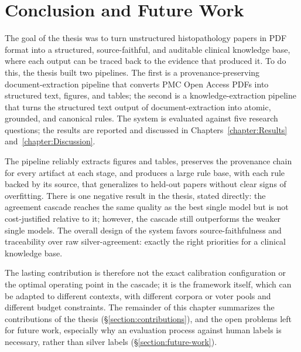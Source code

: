
\chapter{Conclusion and Future Work}\label{chapter:Conclusion_and_Future_Work}

The goal of the thesis was to turn unstructured histopathology papers in PDF format into a structured, source-faithful, and auditable clinical knowledge base, where each output can be traced back to the evidence that produced it. To do this, the thesis built two pipelines. The first is a provenance-preserving document-extraction pipeline that converts PMC Open Access PDFs into structured text, figures, and tables; the second is a knowledge-extraction pipeline that turns the structured text output of document-extraction into atomic, grounded, and canonical rules. The system is evaluated against five research questions; the results are reported and discussed in Chapters~\ref{chapter:Results} and~\ref{chapter:Discussion}.

The pipeline reliably extracts figures and tables, preserves the provenance chain for every artifact at each stage, and produces a large rule base, with each rule backed by its source, that generalizes to held-out papers without clear signs of overfitting. There is one negative result in the thesis, stated directly: the agreement cascade reaches the same quality as the best single model but is not cost-justified relative to it; however, the cascade still outperforms the weaker single models. The overall design of the system favors source-faithfulness and traceability over raw silver-agreement: exactly the right priorities for a clinical knowledge base.

The lasting contribution is therefore not the exact calibration configuration or the optimal operating point in the cascade; it is the framework itself, which can be adapted to different contexts, with different corpora or voter pools and different budget constraints. The remainder of this chapter summarizes the contributions of the thesis (§\ref{section:contributions}), and the open problems left for future work, especially why an evaluation process against human labels is necessary, rather than silver labels (§\ref{section:future-work}).


